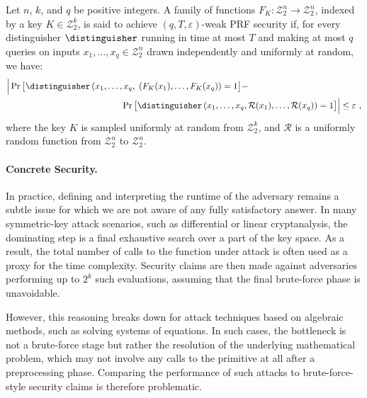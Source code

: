 \documentclass[journal=tosc,submission]{iacrtrans}
\theoremstyle{theorem}
\newcommand\Z{\mathcal{Z}}
\newcommand\lp[1]{\textcolor{blue!80}{\textbf{Léo:} #1}}
\begin{document}
\begin{definition}
Let $n$, $k$, and $q$ be positive integers. A family of functions $F_K : \Z_2^n \to \Z_2^n$, indexed by a key $K \in \Z_2^k$, is said to achieve $(q,T,\varepsilon)$-weak PRF security if, for every distinguisher $\distinguisher$ running in time at most $T$ and making at most $q$ queries on inputs $x_1, \dots, x_q \in \Z_2^n$ drawn independently and uniformly at random, we have:
\begin{equation*}
  \begin{split}
    \Big| 
    \Pr\big[ 
    \distinguisher\left(x_1, \dots, x_q, \right.&\left(F_K(x_1), \dots, F_K(x_q)\right) = 1 
    \big]
    - \\
    \Pr\big[ 
    &\distinguisher\left(x_1, \dots, x_q, \mathcal{R}(x_1), \dots, \mathcal{R}(x_q)\right) = 1 
    \big]
    \Big| \leq \varepsilon~, \\
  \end{split}
\end{equation*}
where the key $K$ is sampled uniformly at random from $\Z_2^k$, and $\mathcal{R}$ is a uniformly random function from $\Z_2^n$ to $\Z_2^n$.
\end{definition}



\paragraph{Concrete Security.}
In practice, defining and interpreting the runtime of the adversary remains a subtle issue for which we are not aware of any fully satisfactory answer. In many symmetric-key attack scenarios, such as differential or linear cryptanalysis, the dominating step is a final exhaustive search over a part of the key space. As a result, the total number of calls to the function under attack is often used as a proxy for the time complexity. Security claims are then made against adversaries performing up to $2^k$ such evaluations, assuming that the final brute-force phase is unavoidable.

However, this reasoning breaks down for attack techniques based on algebraic methods, such as solving systems of equations. In such cases, the bottleneck is not a brute-force stage but rather the resolution of the underlying mathematical problem, which may not involve any calls to the primitive at all after a preprocessing phase. Comparing the performance of such attacks to brute-force-style security claims is therefore problematic.
\end{document}
